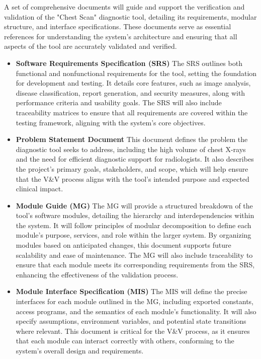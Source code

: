 \documentclass[12pt, titlepage]{article}
\begin{document}
A set of comprehensive documents will guide and support the verification and validation of the "Chest Scan" diagnostic tool, detailing its requirements, modular structure, and interface specifications. These documents serve as essential references for understanding the system’s architecture and ensuring that all aspects of the tool are accurately validated and verified.
\begin{itemize}
  \item \textbf{Software Requirements Specification (SRS)}
    The SRS outlines both functional and nonfunctional requirements for the tool, setting the foundation for development and testing. It details core features, such as image analysis, disease classification, report generation, and security measures, along with performance criteria and usability goals. The SRS will also include traceability matrices to ensure that all requirements are covered within the testing framework, aligning with the system’s core objectives.
  \item \textbf{Problem Statement Document}
    This document defines the problem the diagnostic tool seeks to address, including the high volume of chest X-rays and the need for efficient diagnostic support for radiologists. It also describes the project's primary goals, stakeholders, and scope, which will help ensure that the V\&V process aligns with the tool's intended purpose and expected clinical impact.
  \item \textbf{Module Guide (MG)}
    The MG will provide a structured breakdown of the tool’s software modules, detailing the hierarchy and interdependencies within the system. It will follow principles of modular decomposition to define each module’s purpose, services, and role within the larger system. By organizing modules based on anticipated changes, this document supports future scalability and ease of maintenance. The MG will also include traceability to ensure that each module meets its corresponding requirements from the SRS, enhancing the effectiveness of the validation process.
  \item \textbf{Module Interface Specification (MIS)}
    The MIS will define the precise interfaces for each module outlined in the MG, including exported constants, access programs, and the semantics of each module’s functionality. It will also specify assumptions, environment variables, and potential state transitions where relevant. This document is critical for the V\&V process, as it ensures that each module can interact correctly with others, conforming to the system’s overall design and requirements.
\end{itemize}
\end{document}
